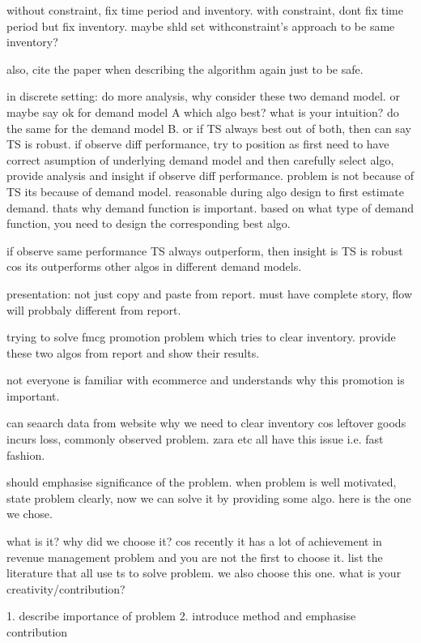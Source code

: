 \documentclass[a4paper]{article}
\begin{document}
	without constraint, fix time period and inventory. with constraint, dont fix time period but fix inventory. maybe shld set withconstraint's approach to be same inventory? 
	
	also, cite the paper when describing the algorithm again just to be safe. 
	
	in discrete setting: do more analysis, why consider these two demand model. or maybe say ok for demand model A which algo best? what is your intuition? do the same for the demand model B. or if TS always best out of both, then can say TS is robust. if observe diff performance, try to position as first need to have correct asumption of underlying demand model and then carefully select algo, provide analysis and insight if observe diff performance. problem is not because of TS its because of demand model. reasonable during algo design to first estimate demand. thats why demand function is important. based on what type of demand function, you need to design the corresponding best algo. 
	
	if observe same performance TS always outperform, then insight is TS is robust cos its outperforms other algos in different demand models.  



		
	presentation: not just copy and paste from report. must have complete story, flow will probbaly different from report. 
	
	trying to solve fmcg promotion problem which tries to clear inventory. provide these two algos from report and show their results. 
	
	not everyone is familiar with ecommerce and understands why this promotion is important. 
	
	can seaarch data from website why we need to clear inventory cos leftover goods incurs loss, commonly observed problem. zara etc all have this issue i.e. fast fashion. 
	
	should emphasise significance of the problem. when problem is well motivated, state problem clearly, now we can solve it by providing some algo. here is the one we chose. 
	
	what is it? why did we choose it? cos recently it has a lot of achievement in revenue management problem and you are not the first to choose it. list the literature that all use ts to solve problem. we also choose this one. what is your creativity/contribution? 
	
	1. describe importance of problem
	2. introduce method and emphasise contribution
\pagebreak
\large
\tableofcontents
\end{document}
